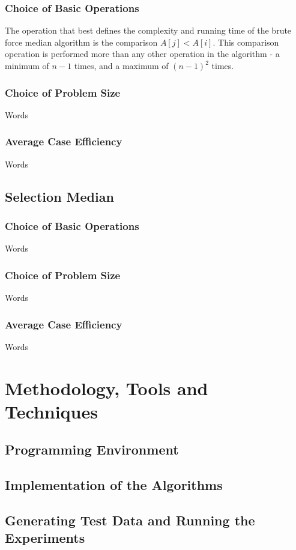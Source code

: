 \documentclass{article}
\begin{document}
        \subsubsection{Choice of Basic Operations}
            The operation that best defines the complexity and running time of the brute force median algorithm is the comparison $A[j] < A[i]$. This comparison operation is performed more than any other operation in the algorithm - a minimum of $n - 1$ times, and a maximum of $(n - 1)^2$ times.
        \subsubsection{Choice of Problem Size}
            Words
        \subsubsection{Average Case Efficiency}
            Words

    \subsection{Selection Median}
        \subsubsection{Choice of Basic Operations}
            Words
        \subsubsection{Choice of Problem Size}
            Words
        \subsubsection{Average Case Efficiency}
            Words

\section{Methodology, Tools and Techniques}
    \subsection{Programming Environment}
    \subsection{Implementation of the Algorithms}
    \subsection{Generating Test Data and Running the Experiments}
\end{document}
